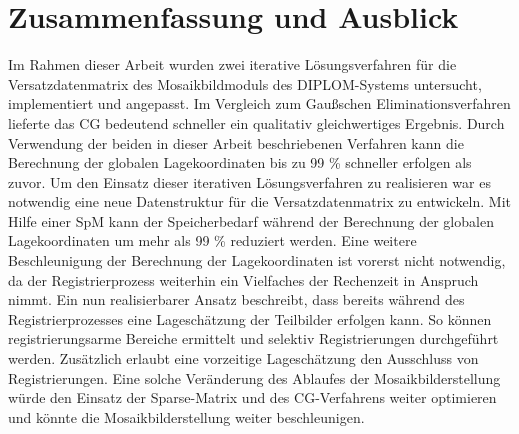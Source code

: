 \chapter{Zusammenfassung und Ausblick}
\label{cha:Fazit}

Im Rahmen dieser Arbeit wurden zwei iterative Lösungsverfahren für die Versatzdatenmatrix des Mosaikbildmoduls des \ac{DIPLOM}-Systems untersucht, implementiert und angepasst. Im Vergleich zum Gaußschen Eliminationsverfahren lieferte das \acl{CG} bedeutend schneller ein qualitativ gleichwertiges Ergebnis. Durch Verwendung der beiden in dieser Arbeit beschriebenen Verfahren kann die Berechnung der globalen Lagekoordinaten bis zu 99 \% schneller erfolgen als zuvor.
\np
Um den Einsatz dieser iterativen Lösungsverfahren zu realisieren war es notwendig eine neue Datenstruktur für die Versatzdatenmatrix zu entwickeln. Mit Hilfe einer \acl{SpM} kann der Speicherbedarf während der Berechnung der globalen Lagekoordinaten um mehr als 99 \% reduziert werden.
\np
Eine weitere Beschleunigung der Berechnung der Lagekoordinaten ist vorerst nicht notwendig, da der Registrierprozess weiterhin ein Vielfaches der Rechenzeit in Anspruch nimmt. Ein nun realisierbarer Ansatz beschreibt, dass bereits während des Registrierprozesses eine Lageschätzung der Teilbilder erfolgen kann. So können registrierungsarme Bereiche ermittelt und selektiv Registrierungen durchgeführt werden. Zusätzlich erlaubt eine vorzeitige Lageschätzung den Ausschluss von Registrierungen. Eine solche Veränderung des Ablaufes der Mosaikbilderstellung würde den Einsatz der Sparse-Matrix und des \ac{CG}-Verfahrens weiter optimieren und könnte die Mosaikbilderstellung weiter beschleunigen.
